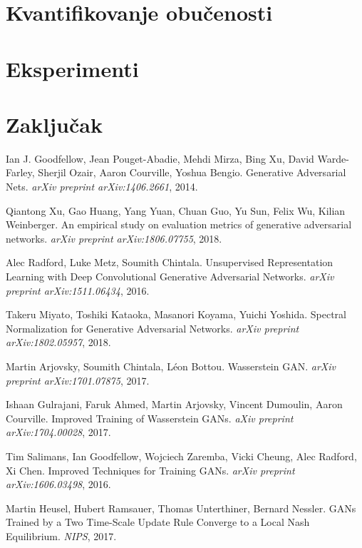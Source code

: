 \documentclass[12pt, a4paper]{article}
\begin{document}
\section{Kvantifikovanje obučenosti}

\section{Eksperimenti}

\section{Zaključak}

\begin{thebibliography}{9}
	Ian J. Goodfellow, Jean Pouget-Abadie, Mehdi Mirza, Bing Xu, David Warde-Farley, Sherjil Ozair, Aaron Courville, Yoshua Bengio. Generative Adversarial Nets. \textit{arXiv preprint arXiv:1406.2661}, 2014.
	
	Qiantong Xu, Gao Huang, Yang Yuan, Chuan Guo, Yu Sun, Felix Wu, Kilian Weinberger. An empirical study on evaluation metrics of generative adversarial networks. \textit{arXiv preprint arXiv:1806.07755}, 2018.
	
	Alec Radford, Luke Metz, Soumith Chintala. Unsupervised Representation Learning with Deep Convolutional Generative Adversarial Networks. \textit{arXiv preprint arXiv:1511.06434}, 2016.
	
	Takeru Miyato, Toshiki Kataoka, Masanori Koyama, Yuichi Yoshida. Spectral Normalization for Generative Adversarial Networks. \textit{arXiv preprint arXiv:1802.05957}, 2018.
	
	Martin Arjovsky, Soumith Chintala, Léon Bottou. Wasserstein GAN. \textit{arXiv preprint arXiv:1701.07875}, 2017.
	
	Ishaan Gulrajani, Faruk Ahmed, Martin Arjovsky, Vincent Dumoulin, Aaron Courville. Improved Training of Wasserstein GANs. \textit{aXiv preprint arXiv:1704.00028}, 2017.
	
	Tim Salimans, Ian Goodfellow, Wojciech Zaremba, Vicki Cheung, Alec Radford, Xi Chen. Improved Techniques for Training GANs. \textit{arXiv preprint arXiv:1606.03498}, 2016.
	
	Martin Heusel, Hubert Ramsauer, Thomas Unterthiner, Bernard Nessler. GANs Trained by a Two Time-Scale Update Rule
	Converge to a Local Nash Equilibrium. \textit{NIPS}, 2017.
	

\end{thebibliography}
\end{document}
